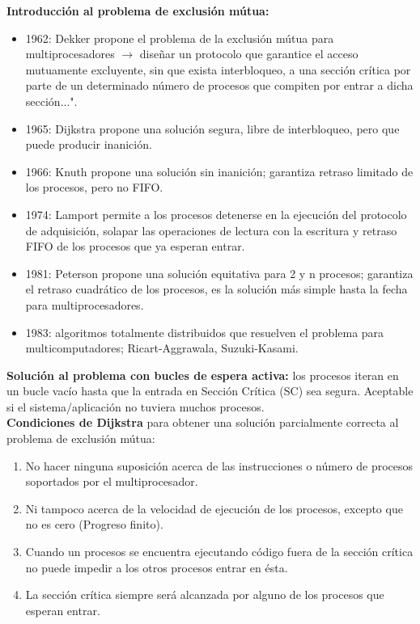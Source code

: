 \documentclass[a4paper,11pt]{article}
\begin{document}
\textbf{Introducción al problema de exclusión mútua:}
\begin{itemize}
\item 1962: Dekker propone el problema de la exclusión mútua para multiprocesadores $\rightarrow$ diseñar un protocolo que garantice el acceso mutuamente excluyente, sin que exista interbloqueo, a una sección crítica por parte de un determinado número de procesos que compiten por entrar a dicha sección...".

\item 1965: Dijkstra propone una solución segura, libre de interbloqueo, pero que puede producir inanición.

\item 1966: Knuth propone una solución sin inanición; garantiza retraso limitado de los procesos, pero no FIFO.

\item 1974: Lamport permite a los procesos detenerse en la ejecución del protocolo de adquisición, solapar las operaciones de lectura con la escritura y retraso FIFO de los procesos que ya esperan entrar.

\item 1981: Peterson propone una solución equitativa para 2 y n procesos; garantiza el retraso cuadrático de los procesos, es la solución más simple hasta la fecha para multiprocesadores.

\item 1983: algoritmos totalmente distribuidos que resuelven el problema para multicomputadores; Ricart-Aggrawala, Suzuki-Kasami.

\end{itemize}

\textbf{Solución al problema con bucles de espera activa:} los procesos iteran en un bucle vacío hasta que la entrada en Sección Crítica (SC) sea segura. Aceptable si el sistema/aplicación no tuviera muchos procesos. \\

\textbf{Condiciones de Dijkstra} para obtener una solución parcialmente correcta al problema de exclusión mútua:

\begin{enumerate}
\item No hacer ninguna suposición acerca de las instrucciones o número de procesos soportados por el multiprocesador.

\item Ni tampoco acerca de la velocidad de ejecución de los procesos, excepto que no es cero (Progreso finito).

\item Cuando un procesos se encuentra ejecutando código fuera de la sección crítica no puede impedir a los otros procesos entrar en ésta.

\item La sección crítica siempre será alcanzada por alguno de los procesos que esperan entrar.
\end{enumerate}
\end{document}
